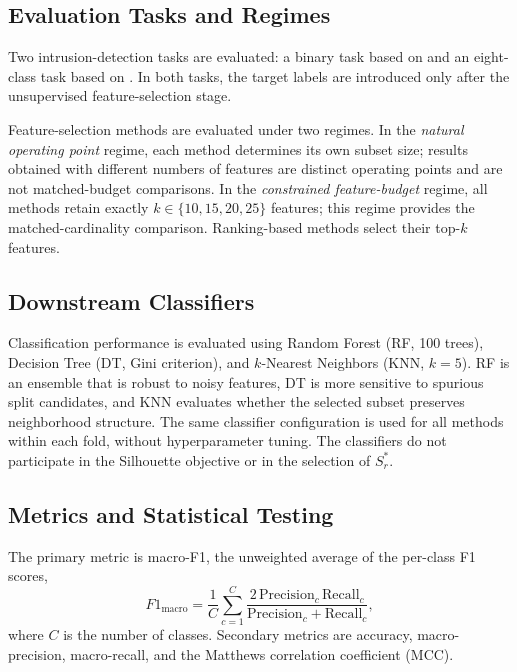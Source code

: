 \subsection{Evaluation Tasks and Regimes}

Two intrusion-detection tasks are evaluated: a binary task based on  and an eight-class task based on . In both tasks, the target labels are introduced only after the unsupervised feature-selection stage.

Feature-selection methods are evaluated under two regimes. In the \emph{natural operating point} regime, each method determines its own subset size; results obtained with different numbers of features are distinct operating points and are not matched-budget comparisons. In the \emph{constrained feature-budget} regime, all methods retain exactly $k \in \{10, 15, 20, 25\}$ features; this regime provides the matched-cardinality comparison. Ranking-based methods select their top-$k$ features. 

\subsection{Downstream Classifiers}

Classification performance is evaluated using Random Forest (RF, 100 trees), Decision Tree (DT, Gini criterion), and $k$-Nearest Neighbors (KNN, $k = 5$). RF is an ensemble that is robust to noisy features, DT is more sensitive to spurious split candidates, and KNN evaluates whether the selected subset preserves neighborhood structure. The same classifier configuration is used for all methods within each fold, without hyperparameter tuning. The classifiers do not participate in the Silhouette objective or in the selection of $S^{*}_r$.

\subsection{Metrics and Statistical Testing}

The primary metric is macro-F1, the unweighted average of the per-class F1 scores,
\begin{equation}
F1_{\mathrm{macro}} = \frac{1}{C}\sum_{c=1}^{C} \frac{2\,\mathrm{Precision}_c\,\mathrm{Recall}_c}{\mathrm{Precision}_c + \mathrm{Recall}_c},
\end{equation}
where $C$ is the number of classes. Secondary metrics are accuracy, macro-precision, macro-recall, and the Matthews correlation coefficient (MCC).

